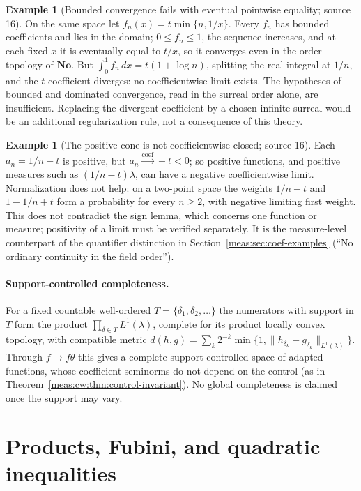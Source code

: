 \documentclass[11pt]{article}
\numberwithin{equation}{section}
\theoremstyle{definition}
\newtheorem{example}[theorem]{Example}
\theoremstyle{remark}
\newcommand{\No}{\mathbf{No}}
\newcommand{\norm}[1]{\lVert#1\rVert}
\newcommand{\tocoef}{\xrightarrow{\mathrm{coef}}}
\begin{document}
\begin{example}[Bounded convergence fails with eventual pointwise equality;
source 16]\label{meas:cw:ex:bct-fail}
On the same space let $f_n(x)=t\min\{n,1/x\}$. Every $f_n$ has bounded
coefficients and lies in the domain; $0\le f_n\le1$, the sequence increases, and
at each fixed $x$ it is eventually equal to $t/x$, so it converges even in the
order topology of $\No$. But $\int_0^1f_n\,dx=t(1+\log n)$, splitting the real
integral at $1/n$, and the $t$-coefficient diverges: no coefficientwise limit
exists. The hypotheses of bounded and dominated convergence, read in the surreal
order alone, are insufficient. Replacing the divergent coefficient by a chosen
infinite surreal would be an additional regularization rule, not a consequence
of this theory.
\end{example}

\begin{example}[The positive cone is not coefficientwise closed; source 16]
\label{meas:cw:ex:positive-not-closed}
Each $a_n=1/n-t$ is positive, but $a_n\tocoef-t<0$; so positive functions, and
positive measures such as $(1/n-t)\lambda$, can have a negative coefficientwise
limit. Normalization does not help: on a two-point space the weights $1/n-t$ and
$1-1/n+t$ form a probability for every $n\ge2$, with negative limiting first
weight. This does not contradict the sign lemma, which concerns one function or
measure; positivity of a limit must be verified separately. It is the
measure-level counterpart of the quantifier distinction in
Section~\ref{meas:sec:coef-examples} (``No ordinary continuity in the field
order'').
\end{example}

\paragraph{Support-controlled completeness.} For a fixed countable well-ordered
$T=\{\delta_1,\delta_2,\ldots\}$ the numerators with support in $T$ form the product
$\prod_{\delta\in T}L^1(\lambda)$, complete for its product locally convex topology,
with compatible metric
$d(h,g)=\sum_k2^{-k}\min\{1,\norm{h_{\delta_k}-g_{\delta_k}}_{L^1(\lambda)}\}$. Through
$f\mapsto f\theta$ this gives a complete support-controlled space of adapted
functions, whose coefficient seminorms do not depend on the control (as in
Theorem~\ref{meas:cw:thm:control-invariant}). No global completeness is claimed
once the support may vary.

\section{Products, Fubini, and quadratic inequalities}
\label{meas:cw:sec:products}
\end{document}
